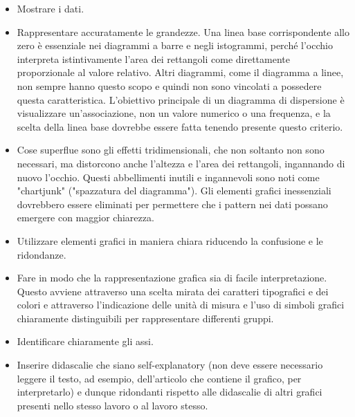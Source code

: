 \documentclass[drafts, 10pt]{book}
\begin{document}
\begin{itemize}
    \item Mostrare i dati.
    \item Rappresentare accuratamente le grandezze. Una linea base corrispondente allo zero è essenziale nei diagrammi a barre e negli istogrammi, perché l'occhio interpreta istintivamente l'area dei rettangoli come direttamente proporzionale al valore relativo. Altri diagrammi, come il diagramma a linee, non sempre hanno questo scopo e quindi non sono vincolati a possedere questa caratteristica. L'obiettivo principale di un diagramma di dispersione è visualizzare un'associazione, non un valore numerico o una frequenza, e la scelta della linea base dovrebbe essere fatta tenendo presente questo criterio.
    \item Cose superflue sono gli effetti tridimensionali, che non soltanto non sono necessari, ma distorcono anche l'altezza e l'area dei rettangoli, ingannando di nuovo l'occhio. Questi abbellimenti inutili e ingannevoli sono noti come "chartjunk" ("spazzatura del diagramma"). Gli elementi grafici inessenziali dovrebbero essere eliminati per permettere che i pattern nei dati possano emergere con maggior chiarezza.
    \item Utilizzare elementi grafici in maniera chiara riducendo la confusione e le ridondanze.
    \item Fare in modo che la rappresentazione grafica sia di facile interpretazione. Questo avviene attraverso una scelta mirata dei caratteri tipografici e dei colori e attraverso l'indicazione delle unità di misura e l'uso di simboli grafici chiaramente distinguibili per rappresentare differenti gruppi.
    \item Identificare chiaramente gli assi.
    \item Inserire didascalie che siano self-explanatory (non deve essere necessario leggere il testo, ad esempio, dell’articolo che contiene il grafico, per interpretarlo) e dunque ridondanti rispetto alle didascalie di altri grafici presenti nello stesso lavoro o al lavoro stesso.
\end{itemize}
\end{document}
